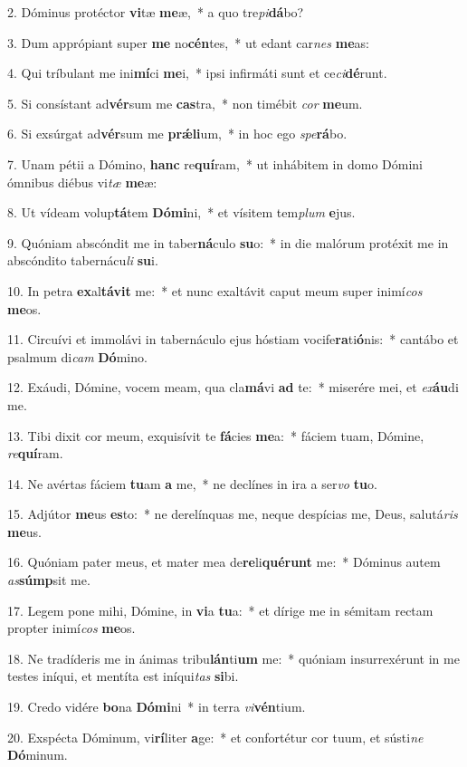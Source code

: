 2. Dóminus protéctor \textbf{vi}tæ \textbf{me}æ,~*  a quo tre\textit{pi}\textbf{dá}bo?\

3. Dum apprópiant super \textbf{me} no\textbf{cén}tes,~*  ut edant car\textit{nes} \textbf{me}as:\

4. Qui tríbulant me ini\textbf{mí}ci \textbf{me}i,~*  ipsi infirmáti sunt et ce\textit{ci}\textbf{dé}runt.\

5. Si consístant ad\textbf{vér}sum me \textbf{cas}tra,~*  non timébit \textit{cor} \textbf{me}um.\

6. Si exsúrgat ad\textbf{vér}sum me \textbf{prǽ}\textbf{li}um,~*  in hoc ego \textit{spe}\textbf{rá}bo.\

7. Unam pétii a Dómino, \textbf{hanc} re\textbf{quí}ram,~*  ut inhábitem in domo Dómini ómnibus diébus vi\textit{tæ} \textbf{me}æ:\

8. Ut vídeam volup\textbf{tá}tem \textbf{Dó}\textbf{mi}ni,~*  et vísitem tem\textit{plum} \textbf{e}jus.\

9. Quóniam abscóndit me in taber\textbf{ná}culo \textbf{su}o:~*  in die malórum protéxit me in abscóndito tabernácu\textit{li} \textbf{su}i.\

10. In petra \textbf{ex}al\textbf{tá}\textbf{vit} me:~*  et nunc exaltávit caput meum super inimí\textit{cos} \textbf{me}os.\

11. Circuívi et immolávi in tabernáculo ejus hóstiam vocife\textbf{ra}ti\textbf{ó}nis:~*  cantábo et psalmum di\textit{cam} \textbf{Dó}mino.\

12. Exáudi, Dómine, vocem meam, qua cla\textbf{má}vi \textbf{ad} te:~*  miserére mei, et \textit{ex}\textbf{áu}di me.\

13. Tibi dixit cor meum, exquisívit te \textbf{fá}cies \textbf{me}a:~*  fáciem tuam, Dómine, \textit{re}\textbf{quí}ram.\

14. Ne avértas fáciem \textbf{tu}am \textbf{a} me,~*  ne declínes in ira a ser\textit{vo} \textbf{tu}o.\

15. Adjútor \textbf{me}us \textbf{es}to:~*  ne derelínquas me, neque despícias me, Deus, salutá\textit{ris} \textbf{me}us.\

16. Quóniam pater meus, et mater mea de\textbf{re}li\textbf{qué}\textbf{runt} me:~*  Dóminus autem \textit{as}\textbf{súmp}sit me.\

17. Legem pone mihi, Dómine, in \textbf{vi}a \textbf{tu}a:~*  et dírige me in sémitam rectam propter inimí\textit{cos} \textbf{me}os.\

18. Ne tradíderis me in ánimas tribu\textbf{lán}ti\textbf{um} me:~*  quóniam insurrexérunt in me testes iníqui, et mentíta est iníqui\textit{tas} \textbf{si}bi.\

19. Credo vidére \textbf{bo}na \textbf{Dó}\textbf{mi}ni~*  in terra \textit{vi}\textbf{vén}tium.\

20. Exspécta Dóminum, vi\textbf{rí}liter \textbf{a}ge:~*  et confortétur cor tuum, et sústi\textit{ne} \textbf{Dó}minum.\

